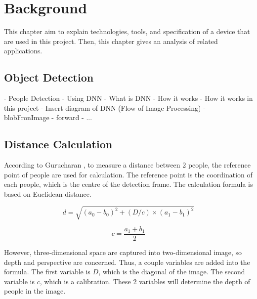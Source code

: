 \chapter{Background}\label{background}

    This chapter aim to explain technologies, tools, and specification of a device that are used in this project.
    Then, this chapter gives an analysis of related applications.

    \section{Object Detection}
        -	People Detection
            - Using DNN
            - What is DNN
            - How it works
            - How it works in this project
                - Insert diagram of DNN (Flow of Image Processing)
                    - blobFronImage
                    - forward
                    - ...

    \section{Distance Calculation}
        According to Gurucharan \cite{SOCIAL-DISTANCING-DETECTION}, to measure a distance between 2 people, the reference point of people are used for calculation.
        The reference point is the coordination of each people, which is the centre of the detection frame.
        The calculation formula is based on Euclidean distance.

        \begin{equation*}
            d = \sqrt{(a_{0}-b_{0})^{2}+(D/c)\times(a_{1}-b_{1})^{2}}
        \end{equation*}

        \begin{equation*}
            c = \frac{a_{1}+b_{1}}{2}
        \end{equation*}

        However, three-dimensional space are captured into two-dimensional image, so depth and perspective are concerned.
        Thus, a couple variables are added into the formula.
        The first variable is $D$, which is the diagonal of the image.
        The second variable is $c$, which is a calibration.
        These 2 variables will determine the depth of people in the image.

